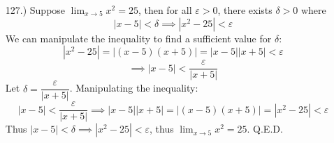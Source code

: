 \documentclass[12pt]{article}
\newcommand{\vertb}[1]{\left\vert#1\right\vert}
\newcommand{\e}{\varepsilon}
\newcommand{\lm}[1]{\displaystyle\lim_{#1}}
\begin{document}
\begin{itemize}
    \item [127.)] Suppose $\lm{x\to5}x^2=25$, then for all $\e>0$, there exists $\delta>0$ where
    \[\vertb{x-5}<\delta\implies\vertb{x^2-25}<\e\]
    We can manipulate the inequality to find a sufficient value for $\delta$:
    \[\vertb{x^2-25}=\vertb{(x-5)(x+5)}=\vertb{x-5}\vertb{x+5}<\e\]
    \[\implies\vertb{x-5}<\frac{\e}{\vertb{x+5}}\]
    Let $\delta=\dfrac{\e}{\vertb{x+5}}$. Manipulating the inequality:
    \[\vertb{x-5}<\frac{\varepsilon}{\vertb{x+5}}\implies\vertb{x-5}\vertb{x+5}=\vertb{(x-5)(x+5)}=\vertb{x^2-25}<\e\]
    Thus $\vertb{x-5}<\delta\implies\vertb{x^2-25}<\e$, thus $\lm{x\to5}x^2=25$. Q.E.D.












\end{itemize}
\end{document}
